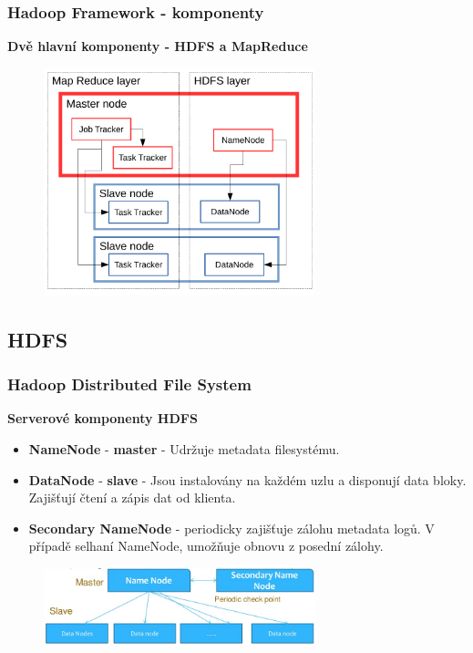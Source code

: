 \documentclass[unicode,bookmarksnumbered]{beamer}
\begin{document}
	\begin{frame}
		\frametitle{Hadoop Framework - komponenty}
		\textbf{Dvě hlavní komponenty - HDFS a MapReduce}
		\begin{figure}
			\centering
			\includegraphics[width=0.7\textwidth]{./img/hadoop/schema2.pdf}
		\end{figure}
	\end{frame}
	\subsection{HDFS} 
	\begin{frame}
		\frametitle{Hadoop Distributed File System}  
			\textbf{Serverové komponenty HDFS}
			\begin{itemize}
				\item \textbf{NameNode} - \textbf{master} - Udržuje metadata filesystému.
				\item \textbf{DataNode} - \textbf{slave} -  Jsou instalovány na každém uzlu
a disponují data bloky. Zajišťují čtení a zápis dat od klienta.
				\item \textbf{Secondary NameNode} - periodicky zajišťuje zálohu metadata
logů. V případě selhaní NameNode, umožňuje obnovu z posední zálohy.
			\end{itemize}
		\begin{figure}
			\centering
			\includegraphics[width=0.7\textwidth]{./img/hadoop/ms.png}
		\end{figure}
	\end{frame}
%
\end{document}
